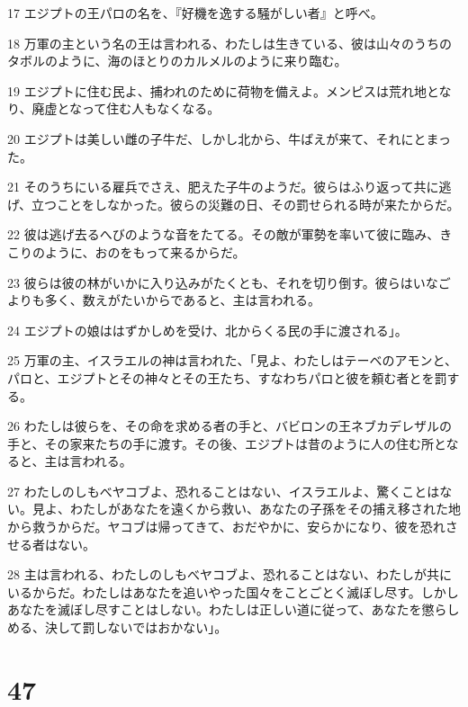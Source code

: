 \par 17 エジプトの王パロの名を、『好機を逸する騒がしい者』と呼べ。
\par 18 万軍の主という名の王は言われる、わたしは生きている、彼は山々のうちのタボルのように、海のほとりのカルメルのように来り臨む。
\par 19 エジプトに住む民よ、捕われのために荷物を備えよ。メンピスは荒れ地となり、廃虚となって住む人もなくなる。
\par 20 エジプトは美しい雌の子牛だ、しかし北から、牛ばえが来て、それにとまった。
\par 21 そのうちにいる雇兵でさえ、肥えた子牛のようだ。彼らはふり返って共に逃げ、立つことをしなかった。彼らの災難の日、その罰せられる時が来たからだ。
\par 22 彼は逃げ去るへびのような音をたてる。その敵が軍勢を率いて彼に臨み、きこりのように、おのをもって来るからだ。
\par 23 彼らは彼の林がいかに入り込みがたくとも、それを切り倒す。彼らはいなごよりも多く、数えがたいからであると、主は言われる。
\par 24 エジプトの娘ははずかしめを受け、北からくる民の手に渡される」。
\par 25 万軍の主、イスラエルの神は言われた、「見よ、わたしはテーベのアモンと、パロと、エジプトとその神々とその王たち、すなわちパロと彼を頼む者とを罰する。
\par 26 わたしは彼らを、その命を求める者の手と、バビロンの王ネブカデレザルの手と、その家来たちの手に渡す。その後、エジプトは昔のように人の住む所となると、主は言われる。
\par 27 わたしのしもべヤコブよ、恐れることはない、イスラエルよ、驚くことはない。見よ、わたしがあなたを遠くから救い、あなたの子孫をその捕え移された地から救うからだ。ヤコブは帰ってきて、おだやかに、安らかになり、彼を恐れさせる者はない。
\par 28 主は言われる、わたしのしもべヤコブよ、恐れることはない、わたしが共にいるからだ。わたしはあなたを追いやった国々をことごとく滅ぼし尽す。しかしあなたを滅ぼし尽すことはしない。わたしは正しい道に従って、あなたを懲らしめる、決して罰しないではおかない」。

\chapter{47}


